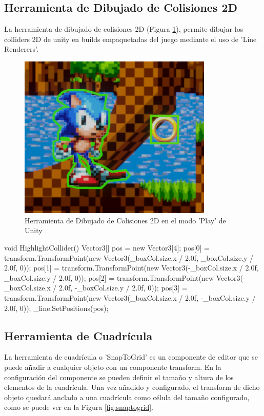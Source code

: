 \subsection{Herramienta de Dibujado de Colisiones 2D}
La herramienta de dibujado de colisiones 2D (Figura \ref{fig:debug2d}), permite dibujar los colliders 2D de unity en builds empaquetadas del juego mediante el uso de
 'Line Renderers'. 

\begin{figure}[H]
  \centering
    \includegraphics[width=350px,clip=true]{debug2d.png}
  \caption{Herramienta de Dibujado de Colisiones 2D en el modo 'Play' de Unity}
  \label{fig:debug2d}
\end{figure}

\begin{mypython}[caption={Algoritmo para pintar un box collider 2D.},label={alg:debugbox2d}]
    void HighlightCollider()
    {
        Vector3[] pos = new Vector3[4];
        pos[0] = transform.TransformPoint(new Vector3(_boxCol.size.x / 2.0f, _boxCol.size.y / 2.0f, 0));
        pos[1] = transform.TransformPoint(new Vector3(-_boxCol.size.x / 2.0f, _boxCol.size.y / 2.0f, 0));
        pos[2] = transform.TransformPoint(new Vector3(-_boxCol.size.x / 2.0f, -_boxCol.size.y / 2.0f, 0));
        pos[3] = transform.TransformPoint(new Vector3(_boxCol.size.x / 2.0f, -_boxCol.size.y / 2.0f, 0));
        _line.SetPositions(pos);
    }
\end{mypython}

\subsection{Herramienta de Cuadrícula}
La herramienta de cuadrícula o 'SnapToGrid' es un componente de editor que se puede añadir a cualquier objeto con un componente transform. En la configuración del componente
 se pueden definir el tamaño y altura de los elementos de la cuadrícula. Una vez añadido y configurado, el transform de dicho objeto quedará anclado a una cuadrícula como 
 célula del tamaño configurado, como se puede ver en la Figura \ref{fig:snaptogrid}.

